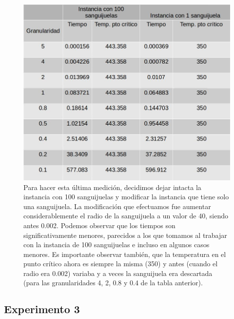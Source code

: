\begin{figure}[H]
\centering
\includegraphics[scale=0.4]{instancias40x40_2.jpg}\caption{Para hacer esta última medición, decidimos dejar intacta la instancia con 100 sanguijuelas y modificar la instancia que tiene solo una sanguijuela. La modificación que efectuamos fue aumentar considerablemente el radio de la sanguijuela a un valor de 40, siendo antes 0.002. Podemos observar que los tiempos son significativamente menores, parecidos a los que tomamos al trabajar con la instancia de 100 sanguijuelas e incluso en algunos casos menores. Es importante observar también, que la temperatura en el punto crítico ahora es siempre la misma (350) y antes (cuando el radio era 0.002) variaba y a veces la sanguijuela era descartada (para las granularidades 4, 2, 0.8 y 0.4 de la tabla anterior).}
\end{figure}



\subsection{Experimento 3}



